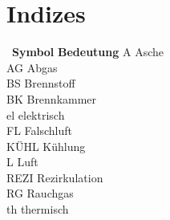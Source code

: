 
\chapter*{Indizes}\thispagestyle{fancy}

\begin{tabbing}
\ \=  \textbf{Symbol} \hspace{0.5cm} \= \textbf{Bedeutung} \kill
\> A \> Asche \\
\> AG \> Abgas \\
\> BS \> Brennstoff \\
\> BK \> Brennkammer \\
\> el \> elektrisch \\
\> FL \> Falschluft \\ 
\> KÜHL \> Kühlung \\
\> L \> Luft \\
\> REZI \> Rezirkulation \\
\> RG \> Rauchgas \\
\> th \> thermisch \\
\end{tabbing}